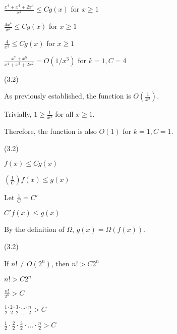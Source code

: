\documentclass{exam}
\begin{document}
\begin{questions}
\begin{subparts}
\begin{center}
\( \frac{x^4 + x^4 + 2x^4}{x^7} \leq Cg(x)\) for \(x \geq 1\)

\( \frac{4x^4}{x^7} \leq Cg(x)\) for \(x \geq 1\)

\( \frac{4}{x^3} \leq Cg(x)\) for \(x \geq 1\)

\( \frac{x^7 + x^5}{x^4 + x^3 + 2x^2} = O(1/x^3)\) for \(k = 1, C = 4\)

\end{center}

\end{subparts}

 (3.2)

\begin{center}

As previously established, the function is \(O(\frac{1}{x^3})\).

Trivially, \(1 \geq \frac{1}{x^3}\) for all \(x \geq 1\).

Therefore, the function is also \(O(1)\) for \(k = 1, C = 1\).

\end{center}

\newpage

 (3.2)

\begin{center}

\( f(x) \leq Cg(x) \)

\( (\frac{1}{C})f(x) \leq g(x) \)

Let \(\frac{1}{C} = C'\)

\( C'f(x) \leq g(x) \)

By the definition of \(\Omega\), \(g(x) = \Omega(f(x))\).

\end{center}

 (3.2)

\begin{center}

If \(n! \neq O(2^n)\), then \(n! > C2^n\)

\( n! > C2^n \)

\( \frac{n!}{2^n} > C \)

\( \frac{1 \cdot 2 \cdot 3 \cdot ... \cdot n}{2 \cdot 2 \cdot 2 \cdot ... \cdot 2} > C\)

\( \frac{1}{2} \cdot \frac{2}{2} \cdot \frac{3}{2} \cdot ... \cdot \frac{n}{2} > C\)


\end{center}
\end{questions}
\end{document}
